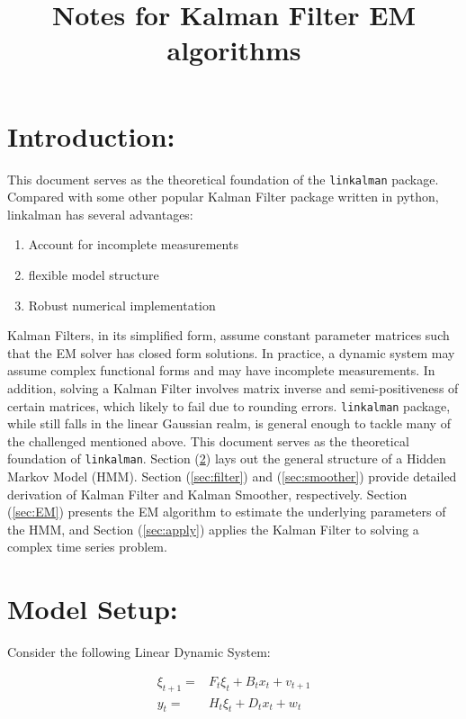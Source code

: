 \documentclass[12pt]{article}
\newenvironment{boenumerate}
    {\begin{enumerate}\renewcommand\labelenumi{\textbf\theenumi}}
    {\end{enumerate}}
\numberwithin{equation}{section}
\begin{document}
\title{Notes for Kalman Filter EM algorithms}

\section{Introduction:}

This document serves as the theoretical foundation of the \texttt{linkalman} package. Compared with some other popular Kalman Filter package written in python, linkalman has several advantages:

\begin{boenumerate}
    \item Account for incomplete measurements 
    \item flexible model structure
    \item Robust numerical implementation
\end{boenumerate}

Kalman Filters, in its simplified form, assume constant parameter matrices such that the EM solver has closed form solutions. In practice, a dynamic system may assume complex functional forms and may have incomplete measurements. In addition, solving a Kalman Filter involves matrix inverse and semi-positiveness of certain matrices, which likely to fail due to rounding errors. \texttt{linkalman} package, while still falls in the linear Gaussian realm, is general enough to tackle many of the challenged mentioned above. This document serves as the theoretical foundation of \texttt{linkalman}. Section (\ref{sec:model_setup}) lays out the general structure of a Hidden Markov Model (HMM). Section (\ref{sec:filter}) and (\ref{sec:smoother}) provide detailed derivation of Kalman Filter and Kalman Smoother, respectively. Section (\ref{sec:EM}) presents the EM algorithm to estimate the underlying parameters of the HMM, and Section (\ref{sec:apply}) applies the Kalman Filter to solving a complex time series problem. 

\section{Model Setup:} \label{sec:model_setup}

Consider the following Linear Dynamic System:

\begin{align}
    \xi_{t+1} = & F_{t}\xi_{t} + B_{t}x_t + v_{t+1} \label{eq:state_evolve} \\
    y_t = & H_t\xi_{t} + D_{t}x_t + w_t \label{eq:measure}
\end{align}
\end{document}
